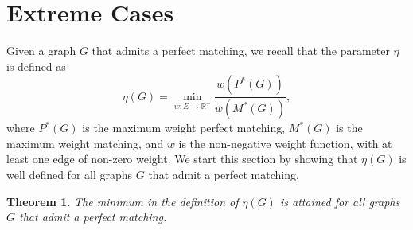 \documentclass{article}
\newtheorem{thm}{Theorem}
\newcommand{\RE}{\mathbb{R}}			\newcommand{\ZZ}{\mathbb{Z}}			\newcommand{\OO}{\widetilde{O}}
\begin{document}
\section{Extreme Cases}
\label{extreme}

Given a graph $G$ that admits a perfect matching, we recall that the parameter $\eta$ is defined as
$$\eta(G) =  \min_{w:E\rightarrow \RE^+} \frac{w(P^*(G))}{w(M^*(G))},$$
where $P^*(G)$ is the maximum weight perfect matching, $M^*(G)$ is the maximum weight matching, and $w$ is the non-negative weight function, with at least one edge of non-zero weight. We start this section by showing that $\eta(G)$ is well defined for all graphs $G$ that admit a perfect matching.

\begin{thm}
\label{thm_min}
The \emph{minimum} in the definition of $\eta(G)$ is attained for all
graphs $G$ that admit a perfect matching.
\end{thm}
\end{document}
